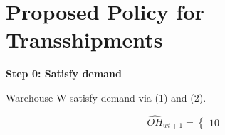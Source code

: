 \documentclass[../../main.tex]{subfiles}
\begin{document}



\section{Proposed Policy for Transshipments}

\textbf{Step 0: Satisfy demand}

Warehouse W satisfy demand via (1) and (2).

\[
\hat{OH}_{wt+1} =
\begin{cases}
1
0
\end{cases}

\]




\end{document}
